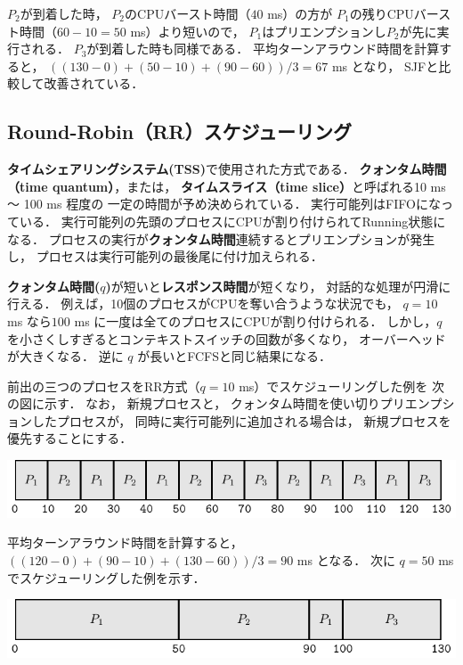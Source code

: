 $P_2$が到着した時，
$P_2$のCPUバースト時間（$40$ ms）の方が
$P_1$の残りCPUバースト時間（$60 - 10 = 50$ ms）より短いので，
$P_1$はプリエンプションし$P_2$が先に実行される．
$P_3$が到着した時も同様である．
平均ターンアラウンド時間を計算すると，
$((130-0)+(50-10)+(90-60))/3=67$ ms となり，
SJFと比較して改善されている．

\subsection{Round-Robin（RR）スケジューリング}
{\bf タイムシェアリングシステム(TSS)}で使用された方式である．
{\bf クォンタム時間（time quantum）}，または，
{\bf タイムスライス（time slice）}と呼ばれる10 ms 〜 100 ms 程度の
一定の時間が予め決められている．
実行可能列はFIFOになっている．
実行可能列の先頭のプロセスにCPUが割り付けられてRunning状態になる．
プロセスの実行が{\bf クォンタム時間}連続するとプリエンプションが発生し，
プロセスは実行可能列の最後尾に付け加えられる．

{\bf クォンタム時間($q$)}が短いと{\bf レスポンス時間}が短くなり，
対話的な処理が円滑に行える．
例えば，10個のプロセスがCPUを奪い合うような状況でも，
$q = 10$ ms なら$100$ ms に一度は全てのプロセスにCPUが割り付けられる．
しかし，$q$ を小さくしすぎるとコンテキストスイッチの回数が多くなり，
オーバーヘッドが大きくなる．
逆に $q$ が長いとFCFSと同じ結果になる．

前出の三つのプロセスをRR方式（$q = 10$ ms）でスケジューリングした例を
次の図に示す．
なお，
新規プロセスと，
クォンタム時間を使い切りプリエンプションしたプロセスが，
同時に実行可能列に追加される場合は，
新規プロセスを優先することにする．

\begin{center}
\includegraphics[scale=1.0]{Tbl/rr1.pdf}
\end{center}

平均ターンアラウンド時間を計算すると，
$((120-0)+(90-10)+(130-60))/3=90$ ms となる．
次に $q = 50$ ms でスケジューリングした例を示す．

\begin{center}
\includegraphics[scale=1.0]{Tbl/rr2.pdf}
\end{center}

